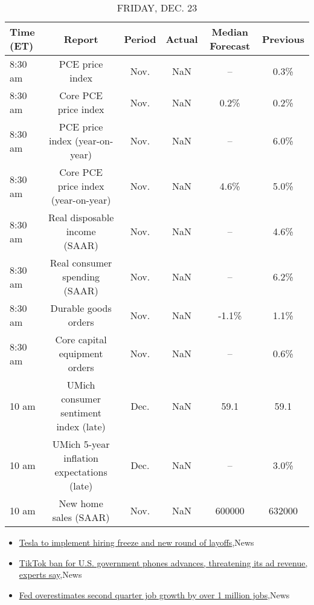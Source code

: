 \documentclass{article}%
\begin{document}
\begin{table}[htbp]%
\caption{FRIDAY, DEC. 23}%
\centering%
\begin{adjustbox}{width=1\textwidth}%
\begin{tabular}{lccccc}
\toprule
Time (ET) &                                     Report & Period & Actual & Median Forecast & Previous \\
\midrule
  8:30 am &                            PCE price index &   Nov. &    NaN &              -- &     0.3\% \\
  8:30 am &                       Core PCE price index &   Nov. &    NaN &            0.2\% &     0.2\% \\
  8:30 am &             PCE price index (year-on-year) &   Nov. &    NaN &              -- &     6.0\% \\
  8:30 am &        Core PCE price index (year-on-year) &   Nov. &    NaN &            4.6\% &     5.0\% \\
  8:30 am &              Real disposable income (SAAR) &   Nov. &    NaN &              -- &     4.6\% \\
  8:30 am &              Real consumer spending (SAAR) &   Nov. &    NaN &              -- &     6.2\% \\
  8:30 am &                       Durable goods orders &   Nov. &    NaN &           -1.1\% &     1.1\% \\
  8:30 am &              Core capital equipment orders &   Nov. &    NaN &              -- &     0.6\% \\
    10 am &      UMich consumer sentiment index (late) &   Dec. &    NaN &            59.1 &     59.1 \\
    10 am & UMich 5-year inflation expectations (late) &   Dec. &    NaN &              -- &     3.0\% \\
    10 am &                      New home sales (SAAR) &   Nov. &    NaN &          600000 &   632000 \\
\bottomrule
\end{tabular}
%
\end{adjustbox}%
\end{table}

%
\begin{itemize}%
\item%
\href{https://reddit.com/r/wallstreetbets/comments/zri8bs/tesla\_to\_implement\_hiring\_freeze\_and\_new\_round\_of/}{Tesla to implement hiring freeze and new round of layoffs},News%
\item%
\href{https://reddit.com/r/Economics/comments/zr9xfq/tiktok\_ban\_for\_us\_government\_phones\_advances/}{TikTok ban for U.S. government phones advances, threatening its ad revenue, experts say},News%
\item%
\href{https://reddit.com/r/Economics/comments/zr4x5o/fed\_overestimates\_second\_quarter\_job\_growth\_by/}{Fed overestimates second quarter job growth by over 1 million jobs},News%
\end{itemize}%
\end{document}
